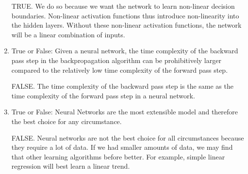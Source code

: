 \documentclass{article}
\begin{document}
\begin{aprob}
\begin{enumerate}
        TRUE. We do so because we want the network to learn non-linear decision boundaries. Non-linear activation functions thus introduce non-linearity into the hidden layers. Without these non-linear activation functions, the network will be a linear combination of inputs.
        
        \item {} True or False: Given a neural network, the time complexity of the backward pass step in the backpropagation algorithm can be prohibitively larger compared to the relatively low time complexity of the forward pass step.
        
        FALSE. The time complexity of the backward pass step is the same as the time complexity of the forward pass step in a neural network.
        
        \item {} True or False: Neural Networks are the most extensible model and therefore the best choice for any circumstance.
        
        FALSE. Neural networks are not the best choice for all circumstances because they require a lot of data. If we had smaller amounts of data, we may find that other learning algorithms before better. For example, simple linear regression will best learn a linear trend. 
        
    \end{enumerate}
    
\end{aprob}
\end{document}
